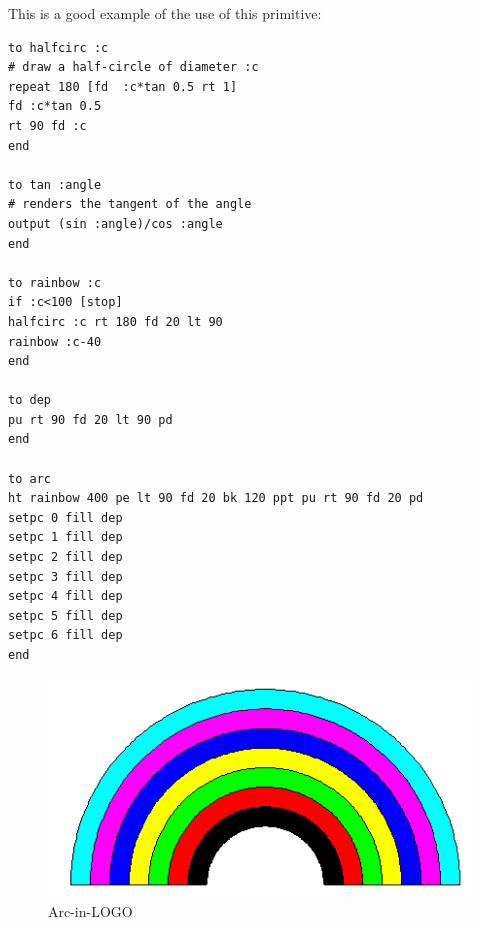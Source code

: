 This is a good example of the use of this primitive:

\begin{verbatim}
to halfcirc :c
# draw a half-circle of diameter :c
repeat 180 [fd  :c*tan 0.5 rt 1]
fd :c*tan 0.5
rt 90 fd :c
end

to tan :angle
# renders the tangent of the angle 
output (sin :angle)/cos :angle
end

to rainbow :c
if :c<100 [stop]
halfcirc :c rt 180 fd 20 lt 90
rainbow :c-40
end

to dep
pu rt 90 fd 20 lt 90 pd
end

to arc
ht rainbow 400 pe lt 90 fd 20 bk 120 ppt pu rt 90 fd 20 pd
setpc 0 fill dep 
setpc 1 fill dep
setpc 2 fill dep
setpc 3 fill dep
setpc 4 fill dep
setpc 5 fill dep
setpc 6 fill dep
end
\end{verbatim} \pagebreak

%
\begin{figure}
\includegraphics*{pics/arc.png}
\caption{Arc-in-LOGO}
\end{figure}
